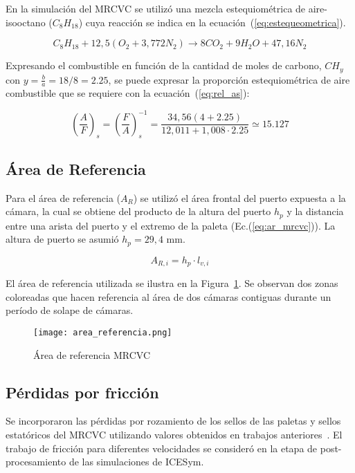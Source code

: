 En la simulación del MRCVC se utilizó una mezcla estequiométrica de
aire-isooctano ($C_{8}H_{18}$) cuya reacción se indica en la
ecuación~(\ref{eq:estequeometrica}).

\begin{equation} \label{eq:estequeometrica} C_{8}H_{18} + 12,5 \left(O_{2}+3,772N_{2}\right) \rightarrow 8 CO_{2} + 9 H_{2}O + 47,16 N_{2}
\end{equation}

Expresando el combustible en función de la cantidad de moles de carbono,
$CH_{y}$ con $y=\frac{b}{a}=18/8=2.25$, se puede expresar la proporción
estequiométrica de aire combustible que se requiere con la
ecuación~(\ref{eq:rel_as}):

\begin{equation} \label{eq:rel_as} \left(\frac{A}{F}\right)_{s} = \left(\frac{F}{A}\right)_{s}^{-1} = \frac{34,56(4+2.25)}{12,011 + 1,008\cdot 2.25} \simeq 15.127
\end{equation}

\subsection{Área de Referencia}
%
Para el área de referencia ($A_{R}$) se utilizó el área frontal del puerto
expuesta a la cámara, la cual se obtiene del producto de la altura del puerto
$h_{p}$ y la distancia entre una arista del puerto y el extremo de la paleta
(Ec.(\ref{eq:ar_mrcvc})).
%
La altura de puerto se asumió $h_{p}=29,4$ mm.

\begin{equation}\label{eq:ar_mrcvc}  A_{R,i} = h_{p} \cdot l_{v,i}
\end{equation}

El área de referencia utilizada se ilustra en la Figura~\ref{fig:area_referencia}.
%
Se observan dos zonas coloreadas que hacen referencia al área de dos cámaras
contiguas durante un período de solape de cámaras.


\begin{figure}[h] \centering
\texttt{[image: area\_referencia.png]}
  \caption{Área de referencia MRCVC}\label{fig:area_referencia}
\end{figure}

\subsection{Pérdidas por fricción}

Se incorporaron las pérdidas por rozamiento de los sellos de las paletas y
sellos estatóricos del MRCVC utilizando valores obtenidos en trabajos
anteriores~\parencite{roldan20}.
%
El trabajo de fricción para diferentes velocidades se consideró en la etapa de
post-procesamiento de las simulaciones de ICESym.

